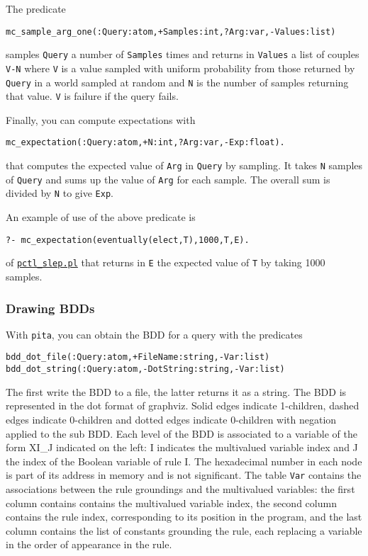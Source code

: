 The predicate
\begin{verbatim}
mc_sample_arg_one(:Query:atom,+Samples:int,?Arg:var,-Values:list)
\end{verbatim}
 samples \verb|Query| a number of \verb|Samples| times
and returns in \verb|Values| a list of couples \verb|V-N| where
\verb|V| is a value sampled with uniform probability from those returned
by \verb|Query| in a world sampled at random and \verb|N| is the number of samples
returning that value.
\verb|V| is failure if the query fails.

Finally, you can compute expectations with
\begin{verbatim}
mc_expectation(:Query:atom,+N:int,?Arg:var,-Exp:float).
\end{verbatim}
that computes the expected value of \verb|Arg| in \verb|Query| by
sampling.
It takes \verb|N| samples of \verb|Query| and sums up the value of \verb|Arg| for
each sample. The overall sum is divided by \verb|N| to give \verb|Exp|.

An example of use of the above predicate is
\begin{verbatim}
?- mc_expectation(eventually(elect,T),1000,T,E).
\end{verbatim}
of \href{http://cplint.ml.unife.it/example/inference/pctl_slep.pl}{\texttt{pctl\_slep.pl}}
that returns in \verb|E| the expected value of \verb|T| by taking 1000 samples.

\subsubsection{Drawing BDDs}

With \verb|pita|, you can obtain the BDD for a query with the predicates
\begin{verbatim}
bdd_dot_file(:Query:atom,+FileName:string,-Var:list)
bdd_dot_string(:Query:atom,-DotString:string,-Var:list)
\end{verbatim}
The first write the BDD to a file, the latter returns it as a string.
The BDD is represented in the dot format of graphviz.
Solid edges indicate 1-children, dashed edges indicate 0-children and dotted
edges indicate 0-children with negation applied to the sub BDD.
Each level of the BDD is associated to a variable of the form XI\_J indicated on the left:
I indicates the multivalued variable index and J the index of the Boolean variable of rule I.
The hexadecimal number in each node is part of its address in memory and is not significant.
The table \verb|Var| contains the associations between the rule groundings and the
multivalued variables: the first column contains contains the multivalued variable index,
the second column contains the rule index, corresponding
to its position in the program, and the last column contains the list
of constants grounding the rule, each replacing a variable in the order of appearance in the
rule.

